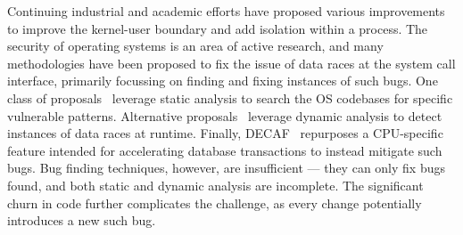 Continuing industrial and academic efforts have proposed various 
improvements to improve the kernel-user boundary and add isolation within
a process.
The security of operating systems is an area of active research, and many
methodologies have been proposed to fix the issue of data races at the system
call interface, primarily focussing on finding and fixing instances of such
bugs.
One class of proposals~\cite{wang2019dftracker, deadline, dftinker} leverage static
analysis to search the OS codebases for specific vulnerable patterns.
Alternative proposals~\cite{schwartzDECAF,jurczyk2013bochspwn,wilhelm2016xenpwn}
leverage dynamic analysis to detect instances of data races at runtime.
Finally, DECAF~\cite{schwartzDECAF} repurposes a CPU-specific feature
intended for accelerating database transactions to instead mitigate such
bugs.
Bug finding techniques, however, are insufficient --- they can only fix
bugs found, and both static and dynamic analysis are incomplete.
The significant churn in code further complicates the challenge, as every
change potentially introduces a new such bug.
